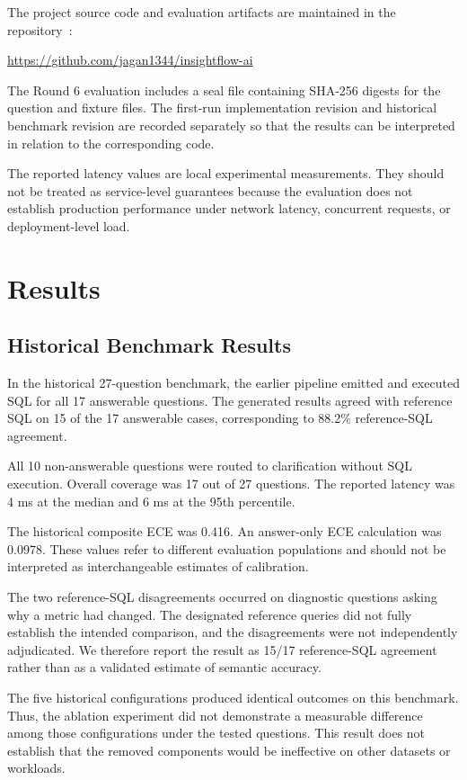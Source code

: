 \documentclass[conference]{IEEEtran}
\begin{document}
The project source code and evaluation artifacts are maintained in the repository~\cite{insightflowrepo}:

\url{https://github.com/jagan1344/insightflow-ai}

The Round 6 evaluation includes a seal file containing SHA-256 digests for the question and fixture files. The first-run implementation revision and historical benchmark revision are recorded separately so that the results can be interpreted in relation to the corresponding code.

The reported latency values are local experimental measurements. They should not be treated as service-level guarantees because the evaluation does not establish production performance under network latency, concurrent requests, or deployment-level load.

\section{Results}

\subsection{Historical Benchmark Results}

In the historical 27-question benchmark, the earlier pipeline emitted and executed SQL for all 17 answerable questions. The generated results agreed with reference SQL on 15 of the 17 answerable cases, corresponding to 88.2\% reference-SQL agreement.

All 10 non-answerable questions were routed to clarification without SQL execution. Overall coverage was 17 out of 27 questions. The reported latency was 4 ms at the median and 6 ms at the 95th percentile.

The historical composite ECE was 0.416. An answer-only ECE calculation was 0.0978. These values refer to different evaluation populations and should not be interpreted as interchangeable estimates of calibration.

The two reference-SQL disagreements occurred on diagnostic questions asking why a metric had changed. The designated reference queries did not fully establish the intended comparison, and the disagreements were not independently adjudicated. We therefore report the result as 15/17 reference-SQL agreement rather than as a validated estimate of semantic accuracy.

The five historical configurations produced identical outcomes on this benchmark. Thus, the ablation experiment did not demonstrate a measurable difference among those configurations under the tested questions. This result does not establish that the removed components would be ineffective on other datasets or workloads.
\end{document}
